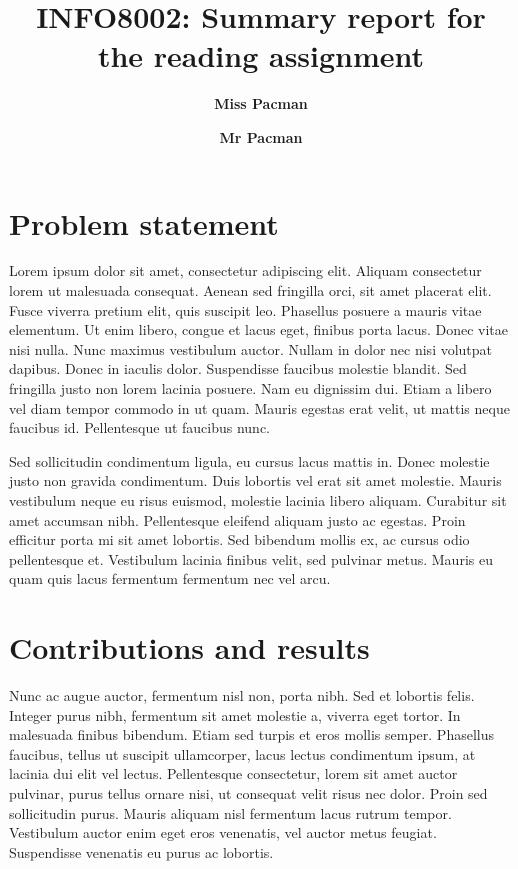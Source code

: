 \documentclass[twocolumn,superscriptaddress,aps]{revtex4-1}
\begin{document}

\title{\Large{INFO8002: Summary report for the reading assignment}}
\vspace{1cm}
\author{\small{\bf Miss Pacman}}
\author{\small{\bf Mr Pacman}}

\maketitle


\section{Problem statement}

Lorem ipsum dolor sit amet, consectetur adipiscing elit. Aliquam consectetur lorem ut malesuada consequat. Aenean sed fringilla orci, sit amet placerat elit. Fusce viverra pretium elit, quis suscipit leo. Phasellus posuere a mauris vitae elementum. Ut enim libero, congue et lacus eget, finibus porta lacus. Donec vitae nisi nulla. Nunc maximus vestibulum auctor. Nullam in dolor nec nisi volutpat dapibus. Donec in iaculis dolor. Suspendisse faucibus molestie blandit. Sed fringilla justo non lorem lacinia posuere. Nam eu dignissim dui. Etiam a libero vel diam tempor commodo in ut quam. Mauris egestas erat velit, ut mattis neque faucibus id. Pellentesque ut faucibus nunc.

Sed sollicitudin condimentum ligula, eu cursus lacus mattis in. Donec molestie justo non gravida condimentum. Duis lobortis vel erat sit amet molestie. Mauris vestibulum neque eu risus euismod, molestie lacinia libero aliquam. Curabitur sit amet accumsan nibh. Pellentesque eleifend aliquam justo ac egestas. Proin efficitur porta mi sit amet lobortis. Sed bibendum mollis ex, ac cursus odio pellentesque et. Vestibulum lacinia finibus velit, sed pulvinar metus. Mauris eu quam quis lacus fermentum fermentum nec vel arcu.

\section{Contributions and results}

Nunc ac augue auctor, fermentum nisl non, porta nibh. Sed et lobortis felis. Integer purus nibh, fermentum sit amet molestie a, viverra eget tortor. In malesuada finibus bibendum. Etiam sed turpis et eros mollis semper. Phasellus faucibus, tellus ut suscipit ullamcorper, lacus lectus condimentum ipsum, at lacinia dui elit vel lectus. Pellentesque consectetur, lorem sit amet auctor pulvinar, purus tellus ornare nisi, ut consequat velit risus nec dolor. Proin sed sollicitudin purus. Mauris aliquam nisl fermentum lacus rutrum tempor. Vestibulum auctor enim eget eros venenatis, vel auctor metus feugiat. Suspendisse venenatis eu purus ac lobortis.
\end{document}
